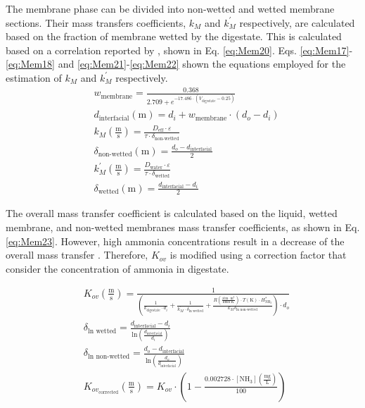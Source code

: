 \begin{refsection}[referencesApD]
The membrane phase can be divided into non-wetted and wetted membrane sections. Their mass transfers coefficients, $k_M$ and $k_M^{'}$ respectively, are calculated based on the fraction of membrane wetted by the digestate. This is calculated based on a correlation reported by \citet{rongwong2020modelin}, shown in Eq. \ref{eq:Mem20}. Eqs. \ref{eq:Mem17}-\ref{eq:Mem18} and \ref{eq:Mem21}-\ref{eq:Mem22} shown the equations employed for the estimation of $k_M$ and $k_M^{'}$ respectively.
\begin{align}
& w_{\text{membrane}} = \frac{0.368}{2.709 + e^{-17.486 \cdot \left(V_{\text{digestate}}-0.25\right)}} \label{eq:Mem20}
\\
& d_{\text{interfacial}} \left(\text{m}\right) = d_i + w_{\text{membrane}} \cdot \left(d_o-d_i\right) \label{eq:Mem19}
\\
&  k_M \left(\frac{\text{m}}{\text{s}}\right) = \frac{D_{\text{eff}} \cdot \varepsilon}{\tau \cdot \delta_{\text{non-wetted}}} \label{eq:Mem17}
\\
& \delta_{\text{non-wetted}} \left(\text{m}\right) = \frac{d_o-d_{\text{interfacial}}}{2} \label{eq:Mem18}
\\
&  k_M^{'} \left(\frac{\text{m}}{\text{s}}\right) = \frac{D_{\text{water}} \cdot \varepsilon}{\tau \cdot \delta_{\text{wetted}}} \label{eq:Mem21}
\\
& \delta_{\text{wetted}} \left(\text{m}\right) = \frac{d_{\text{interfacial}}-d_i}{2} \label{eq:Mem22}
\end{align}

The overall mass transfer coefficient is calculated based on the liquid, wetted membrane, and non-wetted membranes mass transfer coefficients, as shown in Eq. \ref{eq:Mem23}. However, high ammonia concentrations result in a decrease of the overall mass transfer \citep{zhu2005modified}. Therefore, $K_{ov}$ is modified using a correction factor that consider the concentration of ammonia in digestate.

\begin{align}
& K_{ov} \left(\frac{\text{m}}{\text{s}}\right) = \frac{1}{\left(\frac{1}{k_{\text{digestate}} \cdot d_i} + \frac{1}{k_M^{'} \cdot \delta_{\text{ln wetted}}} + \frac{R \left(\frac{\text{atm} \cdot \text{m}^3}{\text{kmol} \cdot \text{K}}\right) \cdot T(\text{K}) \cdot H_{\text{NH}_3}^{*}}{k_M \delta_{\text{ln non-wetted}}}\right) \cdot d_o } \label{eq:Mem23}
\\
& \delta_{\text{ln wetted}} = \frac{d_{\text{interfacial}}-d_i}{\text{ln}\left( \frac{d_{\text{interfacial}}}{d_i}\right)} \label{eq:Mem24}
\\
& \delta_{\text{ln non-wetted}} = \frac{d_o - d_{\text{interfacial}}}{\text{ln}\left( \frac{d_o}{d_{\text{interfacial}}}\right)} \label{eq:Mem25}
\\
& K_{ov_{\text{corrected}}} \left(\frac{\text{m}}{\text{s}}\right) = K_{ov} \cdot \left(1-\frac{0.002728 \cdot \left[\text{NH}_3\right] \left(\frac{\text{mg}}{\text{L}}\right)}{100}\right) \label{eq:KovCorrected}
\end{align}


\end{refsection}

